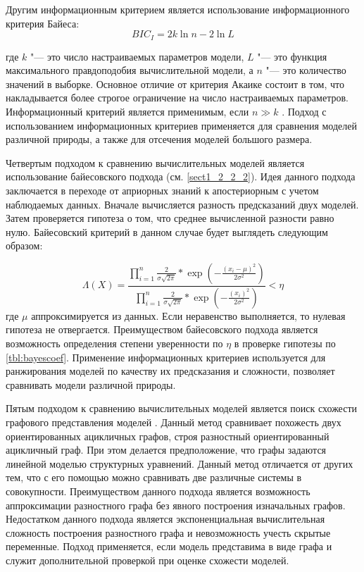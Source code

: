 Другим информационным критерием является использование информационного критерия Байеса: 
\begin{equation}
BIC_I= 2k \ln n - 2\ln L
\end{equation}

где $k$ "--- это число настраиваемых параметров модели, $L$ "--- это функция максимального правдоподобия вычислительной 
модели, а $n$ "--- это количество значений в выборке. Основное отличие от критерия Акаике состоит в том, что 
накладывается более строгое ограничение на число настраиваемых параметров. Информационный критерий является 
применимым, если $n \gg k$ \cite{tarasov2017estimation}. Подход с использованием информационных критериев применяется 
для сравнения моделей различной природы, а также для отсечения моделей большого размера.

Четвертым подходом к сравнению вычислительных моделей является использование байесовского подхода 
(см. \cref{sect1_2_2_2}). Идея данного подхода заключается в переходе от априорных знаний к апостериорным с учетом 
наблюдаемых данных. Вначале вычисляется разность предсказаний двух моделей. Затем проверяется гипотеза о том, что 
среднее вычисленной разности равно нулю. Байесовский критерий в данном случае будет выглядеть следующим образом:

\begin{equation}
\Lambda(X) = \frac{\prod_{i=1}^n \frac{2}{\sigma\sqrt{2\pi}} * \exp{\left(-\frac{\left(x_i - \mu\right)^2 }
    {2\sigma^2}\right)}}{\prod_{i=1}^n \frac{2}{\sigma\sqrt{2\pi}} * \exp{\left(-\frac{\left(x_i \right)^2 }
    {2\sigma^2}\right)}} < \eta
\end{equation}
где $\mu$ аппроксимируется из данных. Если неравенство  выполняется, то нулевая гипотеза не отвергается. Преимуществом 
байесовского подхода является возможность определения степени уверенности по $ \eta $ в проверке гипотезы по 
\cref{tbl:bayescoef}. Применение информационных критериев используется для ранжирования моделей по качеству их 
предсказания и сложности, позволяет сравнивать модели различной природы.

Пятым подходом к сравнению вычислительных моделей является поиск схожести графового представления моделей 
\cite{wang2018direct}. Данный метод сравнивает похожесть двух ориентированных ацикличных графов, строя разностный 
ориентированный ацикличный граф. При этом делается предположение, что графы задаются линейной моделью структурных 
уравнений. Данный метод отличается от других тем, что с его помощью можно сравнивать две различные системы в 
совокупности. Преимуществом данного подхода является возможность аппроксимации разностного графа без явного построения 
изначальных графов.  Недостатком данного подхода является экспоненциальная вычислительная сложность построения 
разностного графа и невозможность учесть скрытые переменные. Подход применяется, если модель представима в виде графа 
и служит дополнительной проверкой при оценке схожести моделей.

